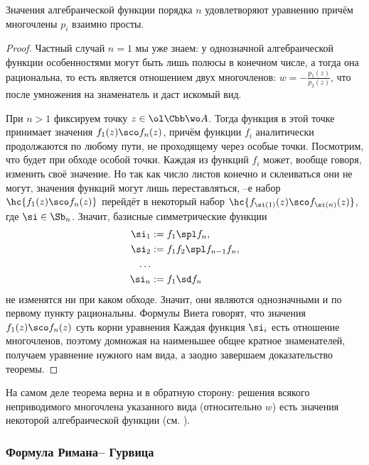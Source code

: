 \documentclass[a4paper]{article}
\begin{document}
\begin{theorem}Значения алгебраической функции порядка $n$ удовлетворяют уравнению
причём многочлены $p_i$ взаимно просты.
\end{theorem}
\begin{proof}
 Частный случай $n=1$ мы уже знаем: у однозначной алгебраической функции особенностями могут быть
лишь полюсы в конечном числе, а тогда она рациональна, то есть является отношением двух многочленов:
$w = -\frac{p_1(z)}{p_2(z)}$, что после умножения на знаменатель и даст искомый вид.

 При $n > 1$ фиксируем точку $z\in \ol\Cbb\wo A$. Тогда функция в этой точке принимает значения $f_1(z)\sco f_n(z)$,
причём функции $f_i$ аналитически продолжаются по любому пути, не проходящему через особые точки. Посмотрим, что будет
при обходе особой точки. Каждая из функций $f_i$ может, вообще говоря, изменить своё значение. Но так как число листов
конечно и склеиваться они не могут, значения функций могут лишь переставляться, --е набор $\hc{f_1(z)\sco f_n(z)}$
перейдёт в некоторый набор $\hc{f_{\si(1)}(z)\sco f_{\si(n)}(z)}$, где $\si \in \Sb_n$. Значит, базисные
симметрические функции
\begin{align*}
\si_1 & := f_1 \spl f_n,\\
\si_2 & := f_1f_2 \spl f_{n-1}f_n,\\
\dots\\
\si_n & := f_1\sd f_n
\end{align*}
не изменятся ни при каком обходе. Значит, они являются однозначными и по первому пункту рациональны. Формулы
Виета говорят, что значения $f_1(z)\sco f_n(z)$ суть корни уравнения
Каждая функция $\si_i$ есть отношение многочленов, поэтому домножая на наименьшее общее кратное знаменателей,
получаем уравнение нужного нам вида, а заодно завершаем доказательство теоремы.
\end{proof}

На самом деле теорема верна и в обратную сторону: решения всякого неприводимого многочлена
указанного вида (относительно $w$) есть значения некоторой алгебраической функции (см. \cite[гл. IV, \S 11]{shabat}).

\subsubsection{Формула Римана-- Гурвица}
\end{document}
